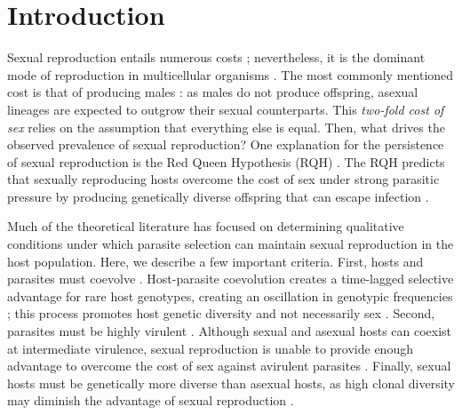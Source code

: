 \documentclass{article}\usepackage[]{graphicx}\usepackage[]{color}
\begin{document}
\section{Introduction}

Sexual reproduction entails numerous costs \citep{lehtonen2012many}; nevertheless, it is 
the dominant mode of reproduction in multicellular organisms \citep{vrijenhoek1998animal, whitton2008dynamic, otto2009evolutionary}. 
The most commonly mentioned cost is that of producing males \citep{smith1978evolution}:
as males do not produce offspring, asexual lineages are expected to outgrow their sexual counterparts.
This \emph{two-fold cost of sex} \citep{smith1978evolution} relies on the assumption that everything else is equal.
Then, what drives the observed prevalence of sexual reproduction?
One explanation for the persistence of sexual reproduction is the Red Queen Hypothesis (RQH) \citep{bell1982masterpiece}.
The RQH predicts that sexually reproducing hosts overcome the cost of sex under strong parasitic pressure by producing genetically diverse offspring that can escape infection \citep{jbs1949disease, jaenike1978hypothesis, hamilton1980sex, hamilton1990sexual}.

Much of the theoretical literature has focused on determining qualitative conditions under which parasite selection can maintain sexual reproduction in the host population.
Here, we describe a few important criteria.
First, hosts and parasites must coevolve \citep{bell1982masterpiece, paterson2010antagonistic}.
Host-parasite coevolution creates a time-lagged selective advantage for rare host genotypes, creating an oscillation in genotypic frequencies \citep{jaenike1978hypothesis, hamilton1980sex, agrawal2001parasites}; this process promotes host genetic diversity and not necessarily sex \citep{king2009geographic, dagan2013clonal, ashby2015diversity}.
Second, parasites must be highly virulent \citep{may1983epidemiology}.
Although sexual and asexual hosts can coexist at intermediate virulence, sexual reproduction is unable to provide enough advantage to overcome the cost of sex against avirulent parasites \citep{howard1994parasitism}.
Finally, sexual hosts must be genetically more diverse than asexual hosts, as high clonal diversity may diminish the advantage of sexual reproduction \citep{lively1994selection, lively2010review, ashby2015diversity}.
\end{document}
